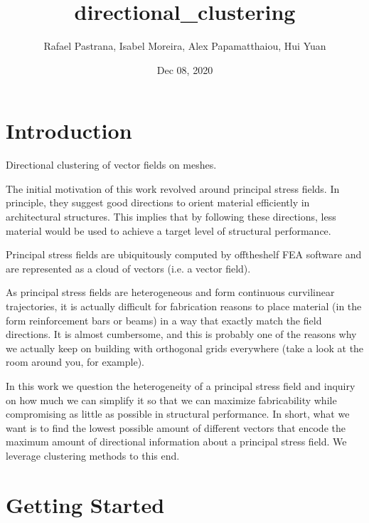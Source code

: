 \documentclass[letterpaper,10pt,english]{sphinxmanual}
\title{directional\_clustering}
\date{Dec 08, 2020}
\author{Rafael Pastrana, Isabel Moreira, Alex Papamatthaiou, Hui Yuan}
\begin{document}
\pagestyle{empty}
\sphinxmaketitle
\pagestyle{plain}
\sphinxtableofcontents
\pagestyle{normal}
\label{\detokenize{index::doc}}



\chapter{Introduction}
\label{\detokenize{intro:introduction}}\label{\detokenize{intro::doc}}
Directional clustering of vector fields on meshes.

\begin{figure}[htbp]
\centering

\noindent{}
\end{figure}

The initial motivation of this work revolved around principal stress fields.
In principle, they suggest good directions to orient material efficiently in
architectural structures. This implies that by following these directions,
less material would be used to achieve a target level of structural performance.

Principal stress fields are ubiquitously computed by off\sphinxhyphen{}the\sphinxhyphen{}shelf FEA software
and are represented as a cloud of vectors (i.e. a vector field).

As principal stress fields are heterogeneous and form continuous curvilinear
trajectories, it is actually difficult for fabrication reasons to place material
(in the form reinforcement bars or beams) in a way that exactly match the field
directions. It is almost cumbersome, and this is probably one of the reasons why
we actually keep on building with orthogonal grids everywhere (take a look at
the room around you, for example).

In this work we question the heterogeneity of a principal stress field and
inquiry on how much we can simplify it so that we can maximize fabricability
while compromising as little as possible in structural performance. In short,
what we want is to find the lowest possible amount of different vectors that
encode the maximum amount of directional information about a principal stress
field. We leverage clustering methods to this end.


\chapter{Getting Started}
\label{\detokenize{gettingstarted:getting-started}}\label{\detokenize{gettingstarted::doc}}
\end{document}
